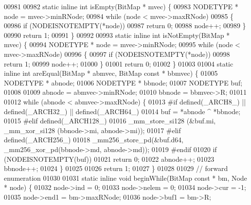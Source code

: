 \begin{DoxyCode}
00981 
00982 \textcolor{keyword}{static} \textcolor{keyword}{inline} \textcolor{keywordtype}{int} isEmpty(BitMap * mvec) \{
00983         NODETYPE * node = mvec->minRNode;
00984         \textcolor{keywordflow}{while} (node < mvec->maxRNode)
00985         \{
00986                 \textcolor{keywordflow}{if} (NODEISNOTEMPTY(*node))
00987                         \textcolor{keywordflow}{return} 0;
00988                 node++;
00989         \}
00990         \textcolor{keywordflow}{return} 1;
00991 \}
00992 
00993 \textcolor{keyword}{static} \textcolor{keyword}{inline} \textcolor{keywordtype}{int} isNotEmpty(BitMap * mvec) \{
00994         NODETYPE * node = mvec->minRNode;
00995         \textcolor{keywordflow}{while} (node < mvec->maxRNode)
00996         \{
00997                 \textcolor{keywordflow}{if} (NODEISNOTEMPTY(*node))
00998                         \textcolor{keywordflow}{return} 1;
00999                 node++;
01000         \}
01001         \textcolor{keywordflow}{return} 0;
01002 \}
01003 
01004 \textcolor{keyword}{static} \textcolor{keyword}{inline} \textcolor{keywordtype}{int} areEqual(BitMap * abmvec, BitMap \textcolor{keyword}{const} * bbmvec) \{
01005         NODETYPE * abnode;
01006         NODETYPE * bbnode;
01007         NODETYPE buf;
01008 
01009         abnode = abmvec->minRNode;
01010         bbnode = bbmvec->R;
01011 
01012         \textcolor{keywordflow}{while} (abnode < abmvec->maxRNode) \{
01013 \textcolor{preprocessor}{#if defined(\_ARCH8\_) || defined(\_ARCH32\_) || defined(\_ARCH64\_)}
01014                 buf = *abnode ^ *bbnode;
01015 \textcolor{preprocessor}{#elif defined(\_ARCH128\_)}
01016                 \_mm\_store\_si128 (&buf.mi, \_mm\_xor\_si128 (bbnode->mi, abnode->mi));
01017 \textcolor{preprocessor}{#elif defined(\_ARCH256\_)}
01018                 \_mm256\_store\_pd(&buf.d64, \_mm256\_xor\_pd(bbnode->md, abnode->md));
01019 \textcolor{preprocessor}{#endif}
01020                 \textcolor{keywordflow}{if} (NODEISNOTEMPTY(buf))
01021                         \textcolor{keywordflow}{return} 0;
01022                 abnode++;
01023                 bbnode++;
01024         \}
01025 
01026         \textcolor{keywordflow}{return} 1;
01027 \}
01028 
01029 \textcolor{comment}{// forward enumeration}
01030 
01031 \textcolor{keyword}{static} \textcolor{keyword}{inline} \textcolor{keywordtype}{void} beginWhile(BitMap \textcolor{keyword}{const} * bm, Node * node) \{
01032         node->ind = 0;
01033         node->nelem = 0;
01034         node->cur = -1;
01035         node->end1 = bm->maxRNode;
01036         node->buf1 = bm->R;

\end{DoxyCode}
